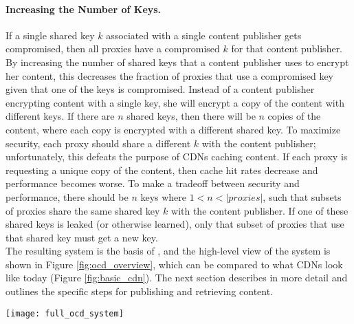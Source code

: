 \paragraph{Increasing the Number of Keys.} If a single shared key $k$ associated with a single content publisher gets 
compromised, then all proxies have a compromised $k$ for that content publisher.  By increasing the number of shared 
keys that a content publisher uses to encrypt her content, this decreases the fraction of proxies that use a 
compromised key given that one of the keys is compromised.  Instead of a content publisher encrypting content with a 
single key, she will encrypt a copy of the content with different keys.  If there are $n$ shared keys, then there 
will be $n$ copies of the content, where each copy is encrypted with a different shared key.  To maximize security, each proxy should share a
different $k$ with the content publisher; unfortunately, this defeats the purpose of CDNs caching content.  If each 
proxy is requesting a unique copy of the content, then cache hit rates decrease and performance becomes worse.  To make 
a tradeoff between security and performance, there should be $n$ keys where $1 < n < |proxies|$, such that subsets of 
proxies share the same shared key $k$ with the content publisher.  If one of these shared keys is leaked (or otherwise learned), only that 
subset of proxies that use that shared key must get a new key.  \\

The resulting system is the basis of \system{}, and the high-level view of the system is shown in Figure \ref{fig:ocd_overview}, 
which can be compared to what CDNs look like today (Figure \ref{fig:basic_cdn}).  The next section describes \system{} in more 
detail and outlines the specific steps for publishing and retrieving content.

\begin{figure*}[t]
\centering
\texttt{[image: full\_ocd\_system]}
\caption{The relationships between clients, the CDN, proxies, and content publishers in 
\system{}.}
\label{fig:ocd_overview}
\end{figure*}
